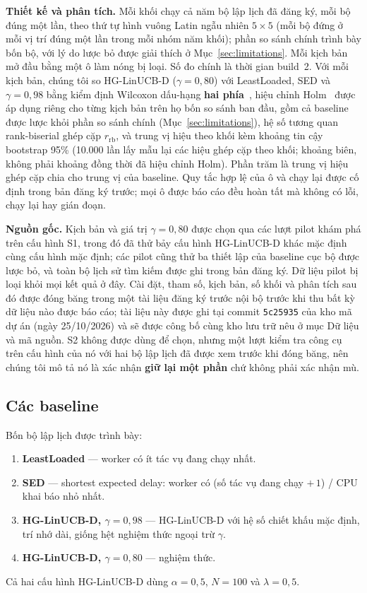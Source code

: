 \documentclass[final,5p,times,twocolumn]{elsarticle}
\begin{document}
\textbf{Thiết kế và phân tích.} Mỗi khối chạy cả năm bộ lập lịch đã đăng ký, mỗi bộ đúng một lần, theo thứ tự hình vuông Latin ngẫu nhiên $5\times5$ (mỗi bộ đứng ở mỗi vị trí đúng một lần trong mỗi nhóm năm khối); phần so sánh chính trình bày bốn bộ, với lý do lược bỏ được giải thích ở Mục~\ref{sec:limitations}. Mỗi kịch bản mở đầu bằng một ô làm nóng bị loại. Số đo chính là thời gian build~2. Với mỗi kịch bản, chúng tôi so HG-LinUCB-D ($\gamma=0{,}80$) với LeastLoaded, SED và $\gamma=0{,}98$ bằng kiểm định Wilcoxon dấu-hạng \textbf{hai phía}~\cite{wilcoxon1945}, hiệu chỉnh Holm~\cite{holm1979} được áp dụng riêng cho từng kịch bản trên họ bốn so sánh ban đầu, gồm cả baseline được lược khỏi phần so sánh chính (Mục~\ref{sec:limitations}), hệ số tương quan rank-biserial ghép cặp $r_{\text{rb}}$, và trung vị hiệu theo khối kèm khoảng tin cậy bootstrap 95\% (10.000 lần lấy mẫu lại các hiệu ghép cặp theo khối; khoảng biên, không phải khoảng đồng thời đã hiệu chỉnh Holm). Phần trăm là trung vị hiệu ghép cặp chia cho trung vị của baseline. Quy tắc hợp lệ của ô và chạy lại được cố định trong bản đăng ký trước; mọi ô được báo cáo đều hoàn tất mà không có lỗi, chạy lại hay gián đoạn.

\textbf{Nguồn gốc.} Kịch bản và giá trị $\gamma=0{,}80$ được chọn qua các lượt pilot khám phá trên cấu hình S1, trong đó đã thử bảy cấu hình HG-LinUCB-D khác mặc định cùng cấu hình mặc định; các pilot cũng thử ba thiết lập của baseline cục bộ được lược bỏ, và toàn bộ lịch sử tìm kiếm được ghi trong bản đăng ký. Dữ liệu pilot bị loại khỏi mọi kết quả ở đây. Cài đặt, tham số, kịch bản, số khối và phân tích sau đó được đóng băng trong một tài liệu đăng ký trước nội bộ trước khi thu bất kỳ dữ liệu nào được báo cáo; tài liệu này được ghi tại commit \texttt{5c25935} của kho mã dự án (ngày 25/10/2026) và sẽ được công bố cùng kho lưu trữ nêu ở mục Dữ liệu và mã nguồn. S2 không được dùng để chọn, nhưng một lượt kiểm tra công cụ trên cấu hình của nó với hai bộ lập lịch đã được xem trước khi đóng băng, nên chúng tôi mô tả nó là xác nhận \textbf{giữ lại một phần} chứ không phải xác nhận mù.

\subsection{Các baseline}
\label{sec:baselines}

Bốn bộ lập lịch được trình bày:
\begin{enumerate}
\item \textbf{LeastLoaded} --- worker có ít tác vụ đang chạy nhất.
\item \textbf{SED} --- shortest expected delay: worker có (số tác vụ đang chạy $+\,1$) / CPU khai báo nhỏ nhất.
\item \textbf{HG-LinUCB-D, $\gamma=0{,}98$} --- HG-LinUCB-D với hệ số chiết khấu mặc định, trí nhớ dài, giống hệt nghiệm thức ngoại trừ $\gamma$.
\item \textbf{HG-LinUCB-D, $\gamma=0{,}80$} --- nghiệm thức.
\end{enumerate}
Cả hai cấu hình HG-LinUCB-D dùng $\alpha=0{,}5$, $N=100$ và $\lambda=0{,}5$.
\end{document}
